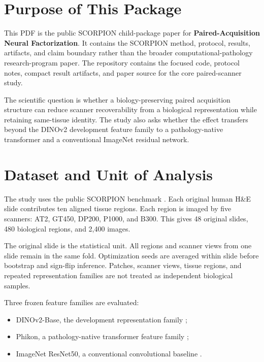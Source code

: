 \documentclass[10pt]{article}
\begin{document}
\section{Purpose of This Package}
This PDF is the public SCORPION child-package paper for \textbf{Paired-Acquisition Neural Factorization}. It contains the SCORPION method, protocol, results, artifacts, and claim boundary rather than the broader computational-pathology research-program paper. The repository contains the focused code, protocol notes, compact result artifacts, and paper source for the core paired-scanner study.

The scientific question is whether a biology-preserving paired acquisition structure can reduce scanner recoverability from a biological representation while retaining same-tissue identity. The study also asks whether the effect transfers beyond the DINOv2 development feature family to a pathology-native transformer and a conventional ImageNet residual network.

\section{Dataset and Unit of Analysis}
The study uses the public SCORPION benchmark \citep{ryu2025scorpion}. Each original human H\&E slide contributes ten aligned tissue regions. Each region is imaged by five scanners: AT2, GT450, DP200, P1000, and B300. This gives 48 original slides, 480 biological regions, and 2,400 images.

The original slide is the statistical unit. All regions and scanner views from one slide remain in the same fold. Optimization seeds are averaged within slide before bootstrap and sign-flip inference. Patches, scanner views, tissue regions, and repeated representation families are not treated as independent biological samples.

Three frozen feature families are evaluated:
\begin{itemize}
  \item DINOv2-Base, the development representation family \citep{oquab2023dinov2};
  \item Phikon, a pathology-native transformer feature family \citep{filiot2023scaling};
  \item ImageNet ResNet50, a conventional convolutional baseline \citep{he2016deep}.
\end{itemize}
\end{document}
